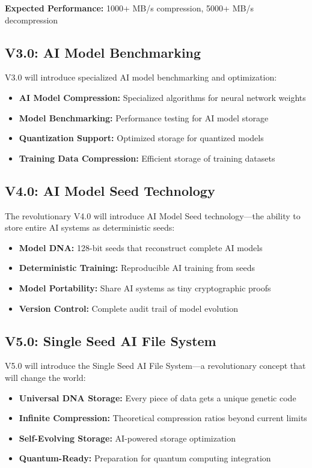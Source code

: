 \documentclass[11pt,a4paper]{article}
\begin{document}
	\textbf{Expected Performance:} 1000+ MB/s compression, 5000+ MB/s decompression
	
	\subsection{V3.0: AI Model Benchmarking}
	
	V3.0 will introduce specialized AI model benchmarking and optimization:
	\begin{itemize}
		\item \textbf{AI Model Compression:} Specialized algorithms for neural network weights
		\item \textbf{Model Benchmarking:} Performance testing for AI model storage
		\item \textbf{Quantization Support:} Optimized storage for quantized models
		\item \textbf{Training Data Compression:} Efficient storage of training datasets
	\end{itemize}
	
	\subsection{V4.0: AI Model Seed Technology}
	
	The revolutionary V4.0 will introduce AI Model Seed technology—the ability to store entire AI systems as deterministic seeds:
	\begin{itemize}
		\item \textbf{Model DNA:} 128-bit seeds that reconstruct complete AI models
		\item \textbf{Deterministic Training:} Reproducible AI training from seeds
		\item \textbf{Model Portability:} Share AI systems as tiny cryptographic proofs
		\item \textbf{Version Control:} Complete audit trail of model evolution
	\end{itemize}
	
	\subsection{V5.0: Single Seed AI File System}
	
	V5.0 will introduce the Single Seed AI File System—a revolutionary concept that will change the world:
	\begin{itemize}
		\item \textbf{Universal DNA Storage:} Every piece of data gets a unique genetic code
		\item \textbf{Infinite Compression:} Theoretical compression ratios beyond current limits
		\item \textbf{Self-Evolving Storage:} AI-powered storage optimization
		\item \textbf{Quantum-Ready:} Preparation for quantum computing integration
	\end{itemize}
	
\end{document}
